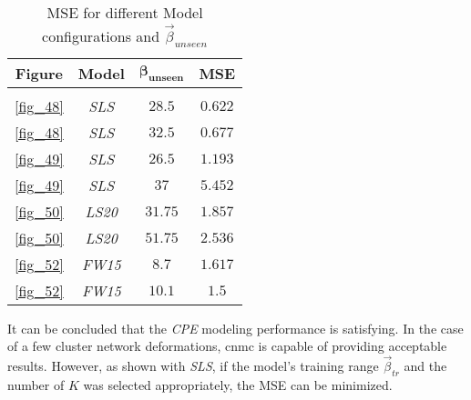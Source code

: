 \begin{table}
    \centering
    \begin{tabular}{c c c c }
        \textbf{Figure} &\textbf{Model} & $\boldsymbol{\beta_{unseen}}$ & \textbf{MSE} \\
        \hline \\
        [-0.8em]
        \ref{fig_48} & \emph{SLS}& $28.5$  & $0.622$   \\
        \ref{fig_48} & \emph{SLS}& $32.5$  & $0.677$   \\
        \ref{fig_49} & \emph{SLS}& $26.5$  & $1.193$   \\
        \ref{fig_49} & \emph{SLS}& $37$  & $5.452$   \\
        \ref{fig_50} & \emph{LS20}& $31.75$  & $1.857$ \\
        \ref{fig_50} & \emph{LS20}& $51.75$  & $2.536$ \\
        \ref{fig_52} & \emph{FW15}& $8.7$  & $1.617$   \\
        \ref{fig_52} & \emph{FW15}& $10.1$  & $1.5$    
    \end{tabular}
    \caption{MSE for different Model configurations and $\vec{\beta}_{unseen}$}
    \label{tab_5_MSE}
\end{table}

It can be concluded that the \emph{CPE} modeling performance is satisfying.
In the case of a few cluster network deformations, \gls{cnmc} is capable of providing acceptable results.
However, as shown with \emph{SLS}, if the model's training range $\vec{\beta}_{tr}$ and the number of $K$ was selected appropriately, the MSE can be minimized.
